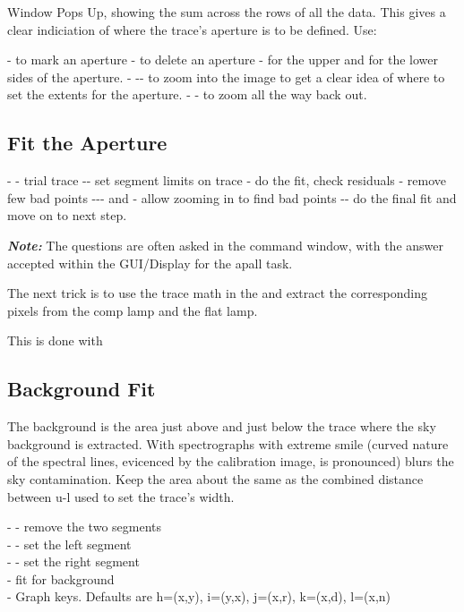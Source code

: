 Window Pops Up, showing the sum across the rows of all the data.
This gives a clear indiciation of where the trace's aperture
is to be defined. Use:

-  to mark an aperture
-  to delete an aperture
-  for the upper and  for the lower sides of the aperture.
- -- to zoom into the image to get a clear idea
   of where to set the extents for the aperture.
- - to zoom all the way back out.

\subsection{Fit the Aperture}
- - trial trace
--  set segment limits on trace
- do the fit, check residuals
- remove few bad points
--- and - allow zooming in to
find bad points
-- do the final fit and move on to next step.


\textbf{\emph{Note:}} The questions are often asked in the command window, with the
answer accepted within the GUI/Display for the apall task.


The next trick is to use the trace math in the  and
extract the corresponding pixels from the comp lamp and the flat lamp.

This is done with 


\subsection{Background Fit}

The background is the area just above and just below the trace
where the sky background is extracted. With spectrographs with
extreme smile (curved nature of the spectral lines, evicenced
by the calibration image, is pronounced) blurs the sky contamination.
Keep the area about the same as the combined distance between u-l
used to set the trace's width. 

- - remove the two segments \\
- - set the left segment \\
- - set the right segment \\
 - fit for background \\

-	Graph keys.  Defaults are h=(x,y), i=(y,x), j=(x,r), k=(x,d), l=(x,n)


